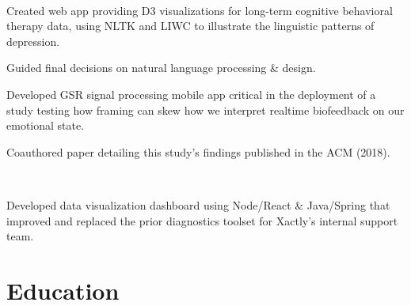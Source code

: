 \documentclass[]{hieudo-build}
\begin{document}
\begin{minipage}[t]{0.62\textwidth}
 \\
\begin{tightemize}
\item Created web app providing D3 visualizations for long-term cognitive behavioral therapy data, using NLTK and LIWC to illustrate the linguistic patterns of depression.  \\
\item Guided final decisions on natural language processing \& design.
\end{tightemize}
\sectionsep
{}
\begin{tightemize}
\item Developed GSR signal processing mobile app  critical in the deployment of a study testing how framing can skew how we interpret realtime biofeedback on our emotional state. \\
\item Coauthored paper detailing this study's findings published in the ACM (2018).
\end{tightemize}
\sectionsep

 \\
\begin{tightemize}
\item Developed data visualization dashboard using Node/React \& Java/Spring that improved and replaced the prior diagnostics toolset for Xactly's internal support team.
\end{tightemize}
\sectionsep


\section{Education} 
 \\
\smallskip
{}
\smallskip
{}


%
%
\end{minipage} 
\end{document}
